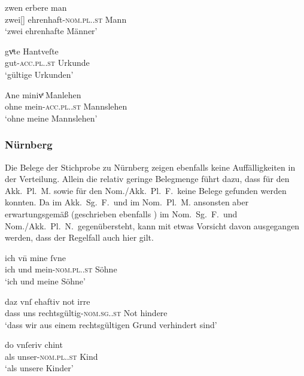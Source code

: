 \begin{exe}
\ex \label{ex:adjaugs}
	\begin{xlist}
	\ex \label{ex:adjaugs_1}
		\gll zwen erbere man \\
			zwei[\MascM] ehrenhaft-\textsc{nom.pl.\MascM.st} Mann \\
		\trans `zwei ehrenhafte Männer'
			\parencites(Nr.~1270, Augsburg, 1290)[508,40]{cao2}

	\ex \label{ex:adjaugs_2}
		\gll gvͤte Hantveſte \\
			gut-\textsc{acc.pl.\FemI.st} Urkunde \\
		\trans `gültige Urkunden'
			\parencites(Nr.~3471, Augsburg, 1299)[557,21]{cao4}

	\ex \label{ex:adjaugs_3}
		\gll Ane minivͤ Manlehen \\
			ohne mein-\textsc{acc.pl.\NeutI.st} Mannslehen \\
		\trans `ohne meine Mannslehen'
			\parencites(Nr.~1363, Augsburg, 1291)[586,9]{cao2}
	\end{xlist}
\end{exe}

\subsubsection{Nürnberg}
\label{par:adjnuernberg}
Die Belege der Stichprobe zu Nürnberg zeigen ebenfalls keine Auffälligkeiten in
der Verteilung. Allein die relativ geringe
Belegmenge führt dazu, dass für den Akk.\ Pl.\ M. sowie für den Nom./Akk.\ Pl.\
F.\ keine Belege gefunden werden konnten. Da \norm{-e} im Akk.\ Sg.\ F.\ und im
Nom.\ Pl.\ M. ansonsten aber erwartungsgemäß \norm{-iu} (geschrieben ebenfalls
\lit{iu}) im Nom.\ Sg.\ F.\ und Nom./Akk.\ Pl.\ N.\ gegenübersteht, kann mit
etwas Vorsicht davon ausgegangen werden, dass der Regelfall auch hier gilt.

\begin{exe}
\ex \label{ex:adjnuern}
	\begin{xlist}
	\ex \label{ex:adjnuern_1}
		\gll ich vn̄ mine ſvne \\
			ich und mein-\textsc{nom.pl.\MascM.st} Söhne \\
		\trans `ich und meine Söhne'
			\parencites(Nr.~3428, Kl.~Seligenporten, Kr.~Neumarkt in der Oberpfalz, 1299)[525,15]{cao4}

	\ex \label{ex:adjnuern_2}
		\gll daz vnſ ehaftiv not irre \\
			dass uns rechtsgültig-\textsc{nom.sg.\FemI.st} Not hindere \\
		\trans `dass wir aus einem rechtsgültigen Grund verhindert sind'
			\parencites(Nr.~949, Nürnberg, 1287)[301,12--13]{cao2}

	\ex \label{ex:adjnuern_3}
		\gll do vnſeriv chint \\
			als unser-\textsc{nom.pl.\NeutX.st} Kind \\
		\trans `als unsere Kinder'
			\parencites(Nrn.~1972~AB, Nürnberg, 1294)[225,17--18]{cao3}
	\end{xlist}
\end{exe}

